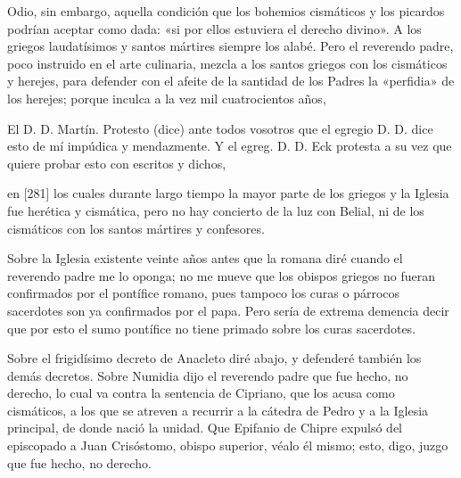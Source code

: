 Odio, sin embargo, aquella condición que los bohemios cismáticos y los picardos podrían aceptar como dada: «si por ellos estuviera el derecho divino». A los griegos laudatísimos y santos mártires siempre los alabé. Pero el reverendo padre, poco instruido en el arte culinaria, mezcla a los santos griegos con los cismáticos y herejes, para defender con el afeite de la santidad de los Padres la «perfidia» de los herejes; porque inculca a la vez mil cuatrocientos años,

El D. D. Martín. Protesto (dice) ante todos vosotros\apnota{37a}{[M U add et publice.} que el egregio D. D. dice esto de mí impúdica y mendazmente. Y el egreg. D. D. Eck protesta a su vez que quiere probar esto con escritos y dichos,

en [281] los cuales durante largo tiempo la mayor parte de los griegos y la Iglesia fue herética y cismática, pero no hay concierto de la luz con Belial, ni de los cismáticos con los santos mártires y confesores.

Sobre la Iglesia existente veinte años antes que la romana diré cuando el reverendo padre me lo oponga; no me mueve que los obispos griegos no fueran confirmados por el pontífice romano, pues tampoco los curas o párrocos sacerdotes son ya confirmados por el papa. Pero sería de extrema demencia decir que por esto el sumo pontífice no tiene primado sobre los curas sacerdotes.

Sobre el frigidísimo decreto de Anacleto diré abajo, y defenderé también los demás decretos. Sobre Numidia dijo el reverendo padre que fue hecho, no derecho, lo cual va contra la sentencia de Cipriano, que los acusa como cismáticos, a los que se atreven a recurrir a la cátedra de Pedro y a la Iglesia principal, de donde nació la unidad. Que Epifanio de Chipre expulsó del episcopado a Juan Crisóstomo, obispo superior, véalo él mismo; esto, digo, juzgo que fue hecho, no derecho.

